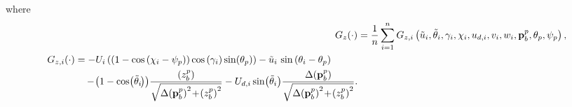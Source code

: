 where
\begin{align}
    G_z(\cdot) &= \frac{1}{n} \sum_{i=1}^n G_{z,i}\left(\tilde{u}_i, \tilde{\theta}_i, \gamma_i, \chi_i, u_{d,i}, v_i, w_i, \mat{p}_b^p, \theta_p, \psi_p\right), \\
    \begin{split}
        G_{z,i}(\cdot) &= -U_i\left(\left(1 - \cos\left(\chi_i - \psi_p\right)\right)\cos\left(\gamma_i\right)\sin(\theta_p)\right) - \tilde{u}_i\,\sin\left(\theta_i - \theta_p\right) \\
        & \quad -\! \left(1 - \cos\!\left(\tilde{\theta}_{i\!}\right)\right)\!\frac{\left(z_b^p\right)}{\sqrt{\Delta\!\left(\mat{p}_b^p\right)^2\! +\! \left(z_b^p\right)^2}} - U_{d,i}\sin\!\left(\tilde{\theta}_i\right)\!\frac{\Delta\!\left(\mat{p}_b^p\right)}{\sqrt{\Delta\!\left(\mat{p}_b^p\right)^2\! +\! \left(z_b^p\right)^2}}.
    \end{split} \label{eq:nsb_5dof_G_z}
\end{align}

